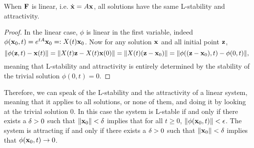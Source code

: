 \begin{lemme}
    When $\mathbf{F}$ is linear, i.e. $\dot{\mathbf{x}}=A\mathbf{x}$, all solutions have the same L-stability and attractivity.
\end{lemme}
\begin{proof}
In the linear case, $\phi$ is linear in the first variable, indeed $\phi(\mathbf{x}_0,t) = e^{tA}\mathbf{x}_0 =: X(t)\mathbf{x}_0$. Now for any solution $\mathbf{x}$ and all initial point $\mathbf{z}$,
\[ \|\phi(\mathbf{z},t)-\mathbf{x}(t)\| = \|X(t)\mathbf{z}-X(t)\mathbf{x}(0)\| = \|X(t)(\mathbf{z}-\mathbf{x}_0)\| =\|\phi((\mathbf{z}-\mathbf{x}_0),t)-\phi(0,t)\|, \] meaning that L-stability and attractivity is entirely determined by the stability of the trivial solution $\phi(0,t)=0$.
\end{proof}
\begin{remarque}
    Therefore, we can speak of the L-stability and the attractivity of a linear system, meaning that it applies to all solutions, or none of them, and doing it by looking at the trivial solution 0. In this case the system is L-stable if and only if there exists a $\delta>0$ such that $\|\mathbf{x}_0\|<\delta$ implies that for all $t\geq0$, $\|\phi(\mathbf{x}_0,t)\|<\epsilon$. The system is attracting if and only if there exists a $\delta>0$ such that $\|\mathbf{x}_0\|<\delta$ implies that $\phi(\mathbf{x}_0,t) \to 0$.
\end{remarque}
 
